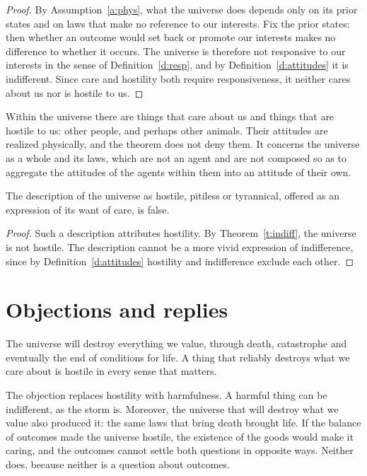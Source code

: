 \documentclass{situationist-preprint}
\begin{document}
\begin{proof}
By Assumption~\ref{a:phys}, what the universe does depends only on its prior states and on laws that make no reference to our interests. Fix the prior states: then whether an outcome would set back or promote our interests makes no difference to whether it occurs. The universe is therefore not responsive to our interests in the sense of Definition~\ref{d:resp}, and by Definition~\ref{d:attitudes} it is indifferent. Since care and hostility both require responsiveness, it neither cares about us nor is hostile to us.
\end{proof}

Within the universe there are things that care about us and things that are hostile to us: other people, and perhaps other animals. Their attitudes are realized physically, and the theorem does not deny them. It concerns the universe as a whole and its laws, which are not an agent and are not composed so as to aggregate the attitudes of the agents within them into an attitude of their own.

\begin{corollary}\label{c:rhetoric}
The description of the universe as hostile, pitiless or tyrannical, offered as an expression of its want of care, is false.
\end{corollary}

\begin{proof}
Such a description attributes hostility. By Theorem~\ref{t:indiff}, the universe is not hostile. The description cannot be a more vivid expression of indifference, since by Definition~\ref{d:attitudes} hostility and indifference exclude each other.
\end{proof}

\section{Objections and replies}

\begin{objection}\label{o:harm}
The universe will destroy everything we value, through death, catastrophe and eventually the end of conditions for life. A thing that reliably destroys what we care about is hostile in every sense that matters.
\end{objection}

\begin{reply}
The objection replaces hostility with harmfulness. A harmful thing can be indifferent, as the storm is. Moreover, the universe that will destroy what we value also produced it: the same laws that bring death brought life. If the balance of outcomes made the universe hostile, the existence of the goods would make it caring, and the outcomes cannot settle both questions in opposite ways. Neither does, because neither is a question about outcomes.
\end{reply}
\end{document}
